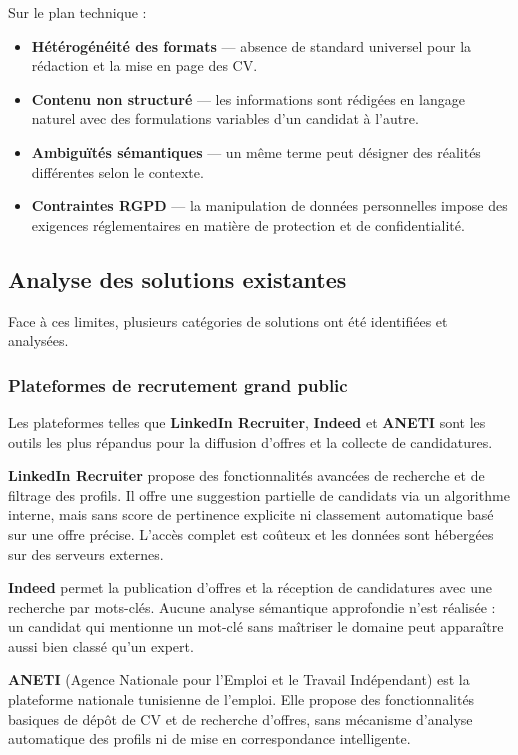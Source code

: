 \documentclass[12pt,a4paper]{report}
\begin{document}
Sur le plan technique :
\begin{itemize}
  \item \textbf{Hétérogénéité des formats} — absence de standard universel pour la rédaction et la mise en page des CV.
  \item \textbf{Contenu non structuré} — les informations sont rédigées en langage naturel avec des formulations variables d'un candidat à l'autre.
  \item \textbf{Ambiguïtés sémantiques} — un même terme peut désigner des réalités différentes selon le contexte.
  \item \textbf{Contraintes RGPD} — la manipulation de données personnelles impose des exigences réglementaires en matière de protection et de confidentialité.
\end{itemize}

\subsection{Analyse des solutions existantes}

Face à ces limites, plusieurs catégories de solutions ont été identifiées et analysées.

\subsubsection{Plateformes de recrutement grand public}

Les plateformes telles que \textbf{LinkedIn Recruiter}, \textbf{Indeed} et \textbf{ANETI} sont les outils les plus répandus pour la diffusion d'offres et la collecte de candidatures.

\textbf{LinkedIn Recruiter} propose des fonctionnalités avancées de recherche et de filtrage des profils. Il offre une suggestion partielle de candidats via un algorithme interne, mais sans score de pertinence explicite ni classement automatique basé sur une offre précise. L'accès complet est coûteux et les données sont hébergées sur des serveurs externes.

\textbf{Indeed} permet la publication d'offres et la réception de candidatures avec une recherche par mots-clés. Aucune analyse sémantique approfondie n'est réalisée : un candidat qui mentionne un mot-clé sans maîtriser le domaine peut apparaître aussi bien classé qu'un expert.

\textbf{ANETI} (Agence Nationale pour l'Emploi et le Travail Indépendant) est la plateforme nationale tunisienne de l'emploi. Elle propose des fonctionnalités basiques de dépôt de CV et de recherche d'offres, sans mécanisme d'analyse automatique des profils ni de mise en correspondance intelligente.
\end{document}
